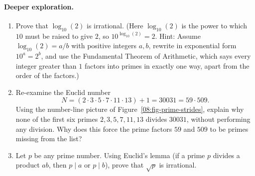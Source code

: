 \paragraph{Deeper exploration.}
\begin{enumerate}[resume]
\item Prove that $\log_{10}(2)$ is irrational. (Here $\log_{10}(2)$ is the power to which $10$ must be raised to give $2$, so $10^{\log_{10}(2)} = 2$. Hint: Assume $\log_{10}(2) = a/b$ with positive integers $a, b$, rewrite in exponential form $10^a = 2^b$, and use the Fundamental Theorem of Arithmetic, which says every integer greater than $1$ factors into primes in exactly one way, apart from the order of the factors.)
\item Re-examine the Euclid number
\[
N = (2 \cdot 3 \cdot 5 \cdot 7 \cdot 11 \cdot 13) + 1 = 30031 = 59 \cdot 509.
\]
Using the number-line picture of Figure~\ref{08:fig-prime-strides}, explain why none of the first six primes $2, 3, 5, 7, 11, 13$ divides $30031$, without performing any division. Why does this force the prime factors $59$ and $509$ to be primes missing from the list?
\item Let $p$ be any prime number. Using Euclid's lemma (if a prime $p$ divides a product $ab$, then $p \mid a$ or $p \mid b$), prove that $\sqrt{p}$ is irrational.
\end{enumerate}

\newpage
